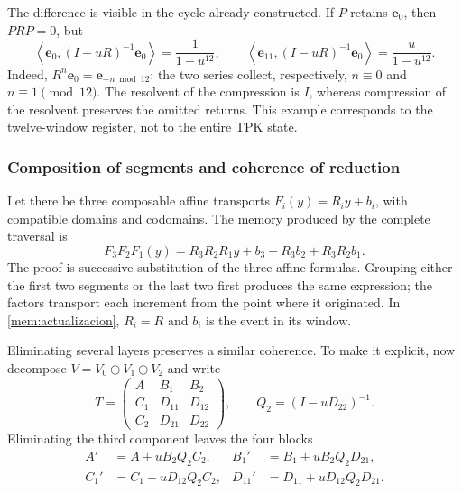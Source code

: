 The difference is visible in the cycle already constructed. If \(P\) retains
\(\mathbf e_0\), then \(PRP=0\), but
\begin{equation}
 \left\langle\mathbf e_0,(I-uR)^{-1}\mathbf e_0\right\rangle
 =\frac1{1-u^{12}},\qquad
 \left\langle\mathbf e_{11},(I-uR)^{-1}\mathbf e_0\right\rangle
 =\frac u{1-u^{12}}.
 \label{mem:ejemplo-ciclo}
\end{equation}
Indeed, \(R^n\mathbf e_0=\mathbf e_{-n\bmod12}\): the
two series collect, respectively, \(n\equiv0\) and
\(n\equiv1\pmod{12}\). The resolvent of the compression is \(I\),
whereas compression of the resolvent preserves the omitted returns.
This example corresponds to the twelve-window register, not to the entire
TPK state.

\subsubsection{Composition of segments and coherence of reduction}

Let there be three composable affine transports
\(F_i(y)=R_i y+b_i\), with compatible domains and codomains.
The memory produced by the complete traversal is
\begin{equation}
 F_3F_2F_1(y)
 =R_3R_2R_1y+b_3+R_3b_2+R_3R_2b_1.
 \label{mem:cociclo-tres}
\end{equation}
The proof is successive substitution of the three affine formulas.
Grouping either the first two segments or the last two first produces
the same expression; the factors transport each increment from
the point where it originated. In \eqref{mem:actualizacion},
\(R_i=R\) and \(b_i\) is the event in its window.

Eliminating several layers preserves a similar coherence.
To make it explicit, now decompose
\(V=V_0\oplus V_1\oplus V_2\) and write
\[
 T=\begin{pmatrix}
 A&B_1&B_2\\C_1&D_{11}&D_{12}\\C_2&D_{21}&D_{22}
 \end{pmatrix},\qquad Q_2=(I-uD_{22})^{-1}.
\]
Eliminating the third component leaves the four blocks
\begin{equation}
 \begin{aligned}
 A'&=A+uB_2Q_2C_2,&
 B_1'&=B_1+uB_2Q_2D_{21},\\
 C_1'&=C_1+uD_{12}Q_2C_2,&
 D_{11}'&=D_{11}+uD_{12}Q_2D_{21}.
 \end{aligned}
 \label{mem:schur-intermedio}
\end{equation}

